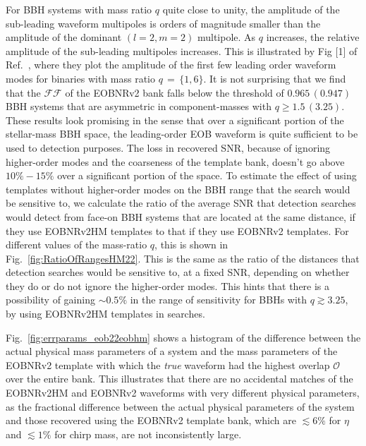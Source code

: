 \documentclass[aps,
prd,
amsmath,
amssymb,
twocolumn,
floatfix,
groupedaddress]{revtex4-1}
\newcommand{\Olap}{\mathcal{O}}
\newcommand{\FF}{\mathcal{FF}}
\begin{document}
For BBH systems with mass ratio $q$ quite close to unity, the amplitude of the sub-leading waveform multipoles is orders of magnitude smaller than the amplitude of the dominant $(l=2,m=2)$ multipole. As $q$ increases, the relative amplitude of the sub-leading multipoles increases. This is illustrated by Fig [1] of Ref.~\citep{BuonannoEOBv2Main}, where they plot the amplitude of the first few leading order waveform modes for binaries with mass ratio $q\,=\,\{1,6\}$. It is not surprising that we find that the $\FF$ of the EOBNRv2 bank falls below the threshold of $0.965\,(0.947)$ BBH systems that are asymmetric in component-masses with $q\geq 1.5\, (3.25)$. These results look promising in the sense that over a significant portion of the stellar-mass BBH space, the leading-order EOB waveform is quite sufficient to be used to detection purposes. The loss in recovered SNR, because of ignoring higher-order modes and the coarseness of the template bank, doesn't go above $10\%-15\%$ over a significant portion of the 
space. To estimate the effect of using templates without higher-order modes on the BBH range that the search would be sensitive to, we calculate the ratio of the average SNR that detection searches would detect from face-on BBH systems that are located at the same distance, if they use EOBNRv2HM templates to that if they use EOBNRv2 templates. For different values of the mass-ratio $q$, this is shown in Fig.~\ref{fig:RatioOfRangesHM22}. This is the same as the ratio of the distances that detection searches would be sensitive to, at a fixed SNR, depending on whether they do or do not ignore the higher-order modes. This hints that there is a possibility of gaining $\sim 0.5\%$ in the range of sensitivity for BBHs with $q\gtrsim 3.25$, by using EOBNRv2HM templates in searches. 


Fig.~\ref{fig:errparams_eob22eobhm} shows a histogram of the difference between the actual physical mass parameters of a system and the mass parameters of the EOBNRv2 template with which the \textit{true} waveform had the highest overlap $\Olap$ over the entire bank. This illustrates that there are no accidental matches of the EOBNRv2HM and EOBNRv2 waveforms with very different physical parameters, as the fractional difference between the actual physical parameters of the system and those recovered using the EOBNRv2 template bank, which are $\lesssim 6\%$ for $\eta$ and $\lesssim 1\%$ for chirp mass, are not inconsistently large. 
\end{document}
